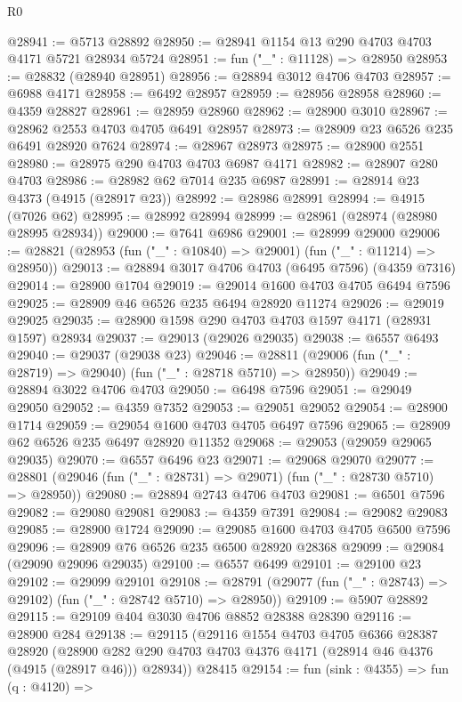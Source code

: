 \begin{lexlean}{R0}
\begin{coremodule}
@28941 := @5713 @28892
@28950 := @28941 @1154 @13 @290 @4703 @4703 @4171 @5721 @28934 @5724
@28951 := fun ("_" : @11128) => @28950
@28953 := @28832 (@28940 @28951)
@28956 := @28894 @3012 @4706 @4703
@28957 := @6988 @4171
@28958 := @6492 @28957
@28959 := @28956 @28958
@28960 := @4359 @28827
@28961 := @28959 @28960
@28962 := @28900 @3010
@28967 := @28962 @2553 @4703 @4705 @6491 @28957
@28973 := @28909 @23 @6526 @235 @6491 @28920 @7624
@28974 := @28967 @28973
@28975 := @28900 @2551
@28980 := @28975 @290 @4703 @4703 @6987 @4171
@28982 := @28907 @280 @4703
@28986 := @28982 @62 @7014 @235 @6987
@28991 := @28914 @23 @4373 (@4915 (@28917 @23))
@28992 := @28986 @28991
@28994 := @4915 (@7026 @62)
@28995 := @28992 @28994
@28999 := @28961 (@28974 (@28980 @28995 @28934))
@29000 := @7641 @6986
@29001 := @28999 @29000
@29006 := @28821 (@28953 (fun ("_" : @10840) => @29001) (fun ("_" : @11214) => @28950))
@29013 := @28894 @3017 @4706 @4703 (@6495 @7596) (@4359 @7316)
@29014 := @28900 @1704
@29019 := @29014 @1600 @4703 @4705 @6494 @7596
@29025 := @28909 @46 @6526 @235 @6494 @28920 @11274
@29026 := @29019 @29025
@29035 := @28900 @1598 @290 @4703 @4703 @1597 @4171 (@28931 @1597) @28934
@29037 := @29013 (@29026 @29035)
@29038 := @6557 @6493
@29040 := @29037 (@29038 @23)
@29046 := @28811 (@29006 (fun ("_" : @28719) => @29040) (fun ("_" : @28718 @5710) => @28950))
@29049 := @28894 @3022 @4706 @4703
@29050 := @6498 @7596
@29051 := @29049 @29050
@29052 := @4359 @7352
@29053 := @29051 @29052
@29054 := @28900 @1714
@29059 := @29054 @1600 @4703 @4705 @6497 @7596
@29065 := @28909 @62 @6526 @235 @6497 @28920 @11352
@29068 := @29053 (@29059 @29065 @29035)
@29070 := @6557 @6496 @23
@29071 := @29068 @29070
@29077 := @28801 (@29046 (fun ("_" : @28731) => @29071) (fun ("_" : @28730 @5710) => @28950))
@29080 := @28894 @2743 @4706 @4703
@29081 := @6501 @7596
@29082 := @29080 @29081
@29083 := @4359 @7391
@29084 := @29082 @29083
@29085 := @28900 @1724
@29090 := @29085 @1600 @4703 @4705 @6500 @7596
@29096 := @28909 @76 @6526 @235 @6500 @28920 @28368
@29099 := @29084 (@29090 @29096 @29035)
@29100 := @6557 @6499
@29101 := @29100 @23
@29102 := @29099 @29101
@29108 := @28791 (@29077 (fun ("_" : @28743) => @29102) (fun ("_" : @28742 @5710) => @28950))
@29109 := @5907 @28892
@29115 := @29109 @404 @3030 @4706 @8852 @28388 @28390
@29116 := @28900 @284
@29138 := @29115
    (@29116
      @1554
      @4703
      @4705
      @6366
      @28387
      @28920
      (@28900 @282 @290 @4703 @4703 @4376 @4171 (@28914 @46 @4376 (@4915 (@28917 @46))) @28934))
    @28415
@29154 := fun (sink : @4355) =>
  fun (q : @4120) =>

\end{coremodule}
\end{lexlean}
